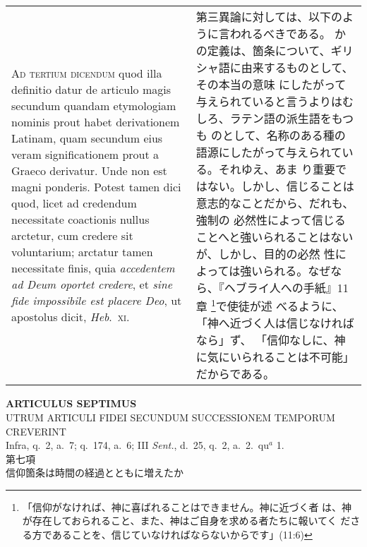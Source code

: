 \documentclass[10pt]{jsarticle} %
\begin{document}
\begin{longtable}{p{21em}p{21em}}
{\scshape Ad tertium dicendum} quod illa definitio
datur de articulo magis secundum quandam etymologiam nominis prout habet
derivationem Latinam, quam secundum eius veram significationem prout a
Graeco derivatur. Unde non est magni ponderis. Potest tamen dici quod,
licet ad credendum necessitate coactionis nullus arctetur, cum credere
sit voluntarium; arctatur tamen necessitate finis, quia {\itshape accedentem ad
Deum oportet credere}, et {\itshape sine fide impossibile est placere Deo}, ut
apostolus dicit, {\itshape Heb}.~{\scshape xi}.


&

第三異論に対しては、以下のように言われるべきである。
かの定義は、箇条について、ギリシャ語に由来するものとして、その本当の意味
 にしたがって与えられていると言うよりはむしろ、ラテン語の派生語をもつも
 のとして、名称のある種の語源にしたがって与えられている。それゆえ、あま
 り重要ではない。しかし、信じることは意志的なことだから、だれも、強制の
 必然性によって信じることへと強いられることはないが、しかし、目的の必然
 性によっては強いられる。なぜなら、『ヘブライ人への手紙』11章
 \footnote{「信仰がなければ、神に喜ばれることはできません。神に近づく者
 は、神が存在しておられること、また、神はご自身を求める者たちに報いてく
 ださる方であることを、信じていなければならないからです」(11:6)}で使徒が述
 べるように、「神へ近づく人は信じなければなら」ず、
 「信仰なしに、神に気にいられることは不可能」だからである。


\end{longtable}
\newpage


\begin{center}
 {\Large {\bf ARTICULUS SEPTIMUS}}\\
 {\large UTRUM ARTICULI FIDEI SECUNDUM SUCCESSIONEM TEMPORUM CREVERINT}\\
 {\footnotesize Infra, q.~2, a.~7; q.~174, a.~6; III {\itshape Sent.},
 d.~25, q.~2, a.~2.~qu$^a$ 1.}\\
 {\Large 第七項\\信仰箇条は時間の経過とともに増えたか}
\end{center}
\end{document}
